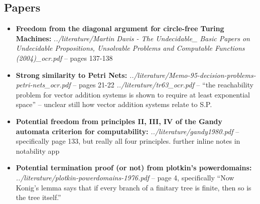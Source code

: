 \documentclass{article}
\begin{document}
\subsection{Papers}
\begin{itemize}
  \item \textbf{Freedom from the diagonal argument for circle-free Turing Machines:} \textit{../literature/Martin Davis - The Undecidable\_ Basic Papers on Undecidable Propositions, Unsolvable Problems and Computable Functions (2004)\_ocr.pdf} -- pages 137-138
  \item {} \label{petri-net} \textbf{Strong similarity to Petri Nets:} \textit{../literature/Memo-95-decision-problems-petri-nets\_ocr.pdf} -- pages 21-22
    \textit{../literature/tr63\_ocr.pdf} -- ``the reachability problem for vector addition systems is shown to require at least exponential space'' -- unclear still how vector addition systems relate to S.P.
  \item \textbf{Potential freedom from principles II, III, IV of the Gandy automata criterion for computability:} \textit{../literature/gandy1980.pdf} -- specifically page 133, but really all four principles. further inline notes in notability app
  \item \textbf{Potential termination proof (or not) from plotkin's powerdomains:} \textit{../literature/plotkin-powerdomains-1976.pdf} -- page 4, specifically ``Now Konig’s
lemma says that if every branch of a finitary tree is finite, then so is the tree
itself.''
\end{itemize}
\end{document}
